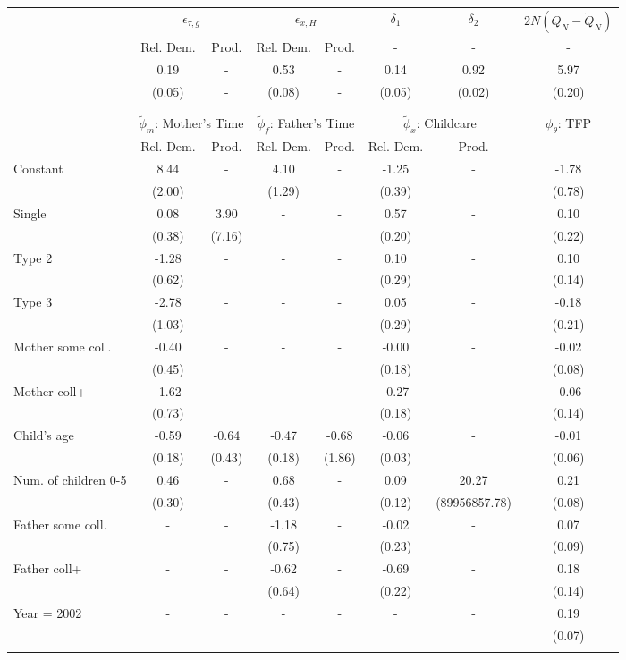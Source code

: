 \begin{tabular}{lccccccc}\toprule
 & \multicolumn{2}{c}{$\epsilon_{\tau,g}$} & \multicolumn{2}{c}{$\epsilon_{x,H}$} & {$\delta_{1}$} & {$\delta_{2}$} & $2N(Q_{N} - \tilde{Q}_{N})$ \\
 & Rel. Dem. & Prod. & Rel. Dem. & Prod. & - & - & - \\\cmidrule(r){2-3}\cmidrule(r){4-5}\cmidrule(r){6-6}\cmidrule(r){7-7}\cmidrule(r){8-8}
&0.19& - &0.53& - &0.14&0.92&5.97\\
&(0.05)& - &(0.08)& - &(0.05)&(0.02)&(0.20)\\
\\
&&&&&&&\\
 & \multicolumn{2}{c}{$\tilde{\phi}_{m}$: Mother's Time} & \multicolumn{2}{c}{$\tilde{\phi}_{f}$: Father's Time} & \multicolumn{2}{c}{$\tilde{\phi}_{x}$: Childcare} &{$\phi_{\theta}$: TFP} \\
 & Rel. Dem. & Prod. & Rel. Dem. & Prod. & Rel. Dem. & Prod. & -  \\\cmidrule(r){2-3}\cmidrule(r){4-5}\cmidrule(r){6-7}\cmidrule(r){8-8}
Constant&8.44& -&4.10& -&-1.25& -&-1.78\\
&(2.00)&&(1.29)&&(0.39)&&(0.78)\\
Single&0.08&3.90& - & -&0.57& -&0.10\\
&(0.38)&(7.16) & &&(0.20)&&(0.22)\\
Type 2&-1.28& -& - & -&0.10& -&0.10\\
&(0.62)& & &&(0.29)&&(0.14)\\
Type 3&-2.78& -& - & -&0.05& -&-0.18\\
&(1.03)& & &&(0.29)&&(0.21)\\
Mother some coll.&-0.40& -& - & -&-0.00& -&-0.02\\
&(0.45)& & &&(0.18)&&(0.08)\\
Mother coll+&-1.62& -& - & -&-0.27& -&-0.06\\
&(0.73)& & &&(0.18)&&(0.14)\\
Child's age&-0.59&-0.64&-0.47&-0.68&-0.06& -&-0.01\\
&(0.18)&(0.43)&(0.18)&(1.86)&(0.03)&&(0.06)\\
Num. of children 0-5&0.46& -&0.68& -&0.09&20.27&0.21\\
&(0.30)&&(0.43)&&(0.12)&(89956857.78)&(0.08)\\
Father some coll.& - & -&-1.18& -&-0.02& -&0.07\\
 & &&(0.75)&&(0.23)&&(0.09)\\
Father coll+& - & -&-0.62& -&-0.69& -&0.18\\
 & &&(0.64)&&(0.22)&&(0.14)\\
Year = 2002& - & -& - & -& - & -&0.19\\
 & & & & & &&(0.07)\\
\\
\bottomrule\end{tabular}
